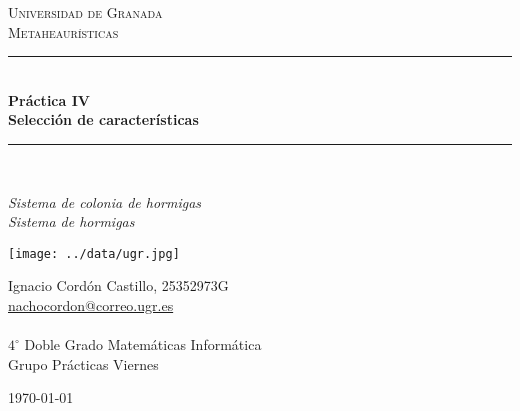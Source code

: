 \documentclass[a4paper,11pt]{article}
\begin{document}
\begin{titlepage}

\newcommand{\HRule}{\rule{\linewidth}{0.5mm}} %

\center %
 
\textsc{\LARGE Universidad de Granada}\\[1.5cm]
\textsc{\Large Metaheaurísticas}\\[0.5cm] 

\bigskip
\HRule \\[0.4cm]
{ \huge \bfseries Práctica IV}\\[0.4cm] %
{ \huge \bfseries Selección de características}\\
\HRule \\[1.5cm]
 

\begin{minipage}{\textwidth}
\begin{center} \large
\emph{Sistema de colonia de hormigas}\\
\emph{Sistema de hormigas}\\
\end{center}
\end{minipage}


\begin{center}
\texttt{[image: ../data/ugr.jpg]}
\end{center}

\begin{minipage}{\textwidth}
\begin{center} \large
Ignacio Cordón Castillo, 25352973G\\
\url{nachocordon@correo.ugr.es}\\
\ \\
$4^{\circ}$ Doble Grado Matemáticas Informática\\
Grupo Prácticas Viernes
\end{center}
\end{minipage}


\vspace{\fill}%
\large\today
\end{titlepage}  
\end{document}
